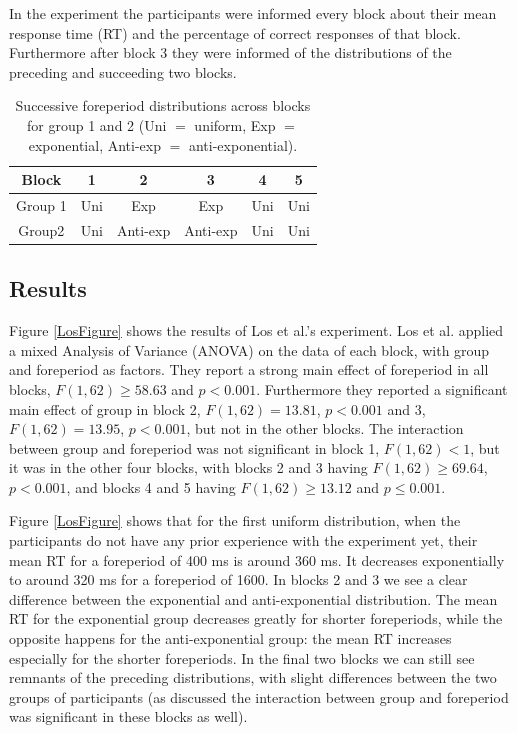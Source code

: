 \documentclass[10pt,letterpaper]{article}
\begin{document}
In the experiment the participants were informed every block about their mean response time (RT) and the percentage of correct responses of that block. Furthermore after block 3 they were informed of the distributions of the preceding and succeeding two blocks.

\begin{table}
	\centering
	\caption{Successive foreperiod distributions across blocks for group 1 and 2 (Uni $=$ uniform, Exp $=$ exponential, Anti-exp $=$ anti-exponential).}
	\begin{tabular}{c|c|c|c|c|c}
		Block & 1 & 2 & 3 & 4 & 5 \\
		\hline
		Group 1 & Uni & Exp & Exp & Uni & Uni \\
		Group2 & Uni & Anti-exp & Anti-exp & Uni & Uni
	\end{tabular}
	\label{Table1}
\end{table}

\subsection{Results}
Figure \ref{LosFigure} shows the results of Los et al.'s experiment. Los et al. applied a mixed Analysis of Variance (ANOVA) on the data of each block, with group and foreperiod as factors. They report a strong main effect of foreperiod in all blocks, $F (1, 62) \geq 58.63$ and $p < 0.001$. Furthermore they reported a significant main effect of group in block 2, $F (1, 62) = 13.81$, $p < 0.001$ and 3, $F(1, 62) = 13.95$, $p < 0.001$, but not in the other blocks. The interaction between group and foreperiod was not significant in block 1, $F(1, 62) < 1$, but it was in the other four blocks, with blocks 2 and 3 having $F (1, 62) \geq 69.64$, $p < 0.001$, and blocks 4 and 5 having $F (1, 62) \geq 13.12$ and $p \leq 0.001$.

Figure \ref{LosFigure} shows that for the first uniform distribution, when the participants do not have any prior experience with the experiment yet, their mean RT for a foreperiod of 400 ms is around 360 ms. It decreases exponentially to around 320 ms for a foreperiod of 1600. In blocks 2 and 3 we see a clear difference between the exponential and anti-exponential distribution. The mean RT for the exponential group decreases greatly for shorter foreperiods, while the opposite happens for the anti-exponential group: the mean RT increases especially for the shorter foreperiods. In the final two blocks we can still see remnants of the preceding distributions, with slight differences between the two groups of participants (as discussed the interaction between group and foreperiod was significant in these blocks as well).
\end{document}
